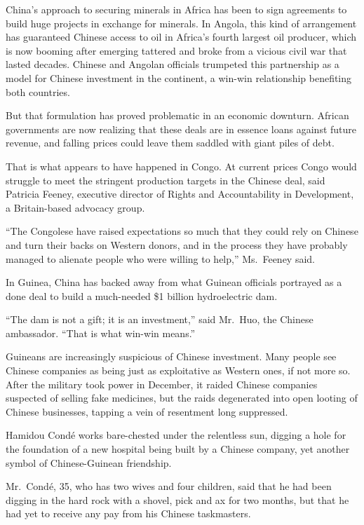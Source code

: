 \documentclass[12pt,a4paper,onecolumn]{article}
\begin{document}
\begin{CJK*}{GBK}{song}
China's approach to securing minerals in Africa has been to sign agreements to build huge projects
in exchange for minerals. In Angola, this kind of arrangement has guaranteed Chinese access to oil
in Africa's fourth largest oil producer, which is now booming after emerging tattered and broke from
a vicious civil war that lasted decades. Chinese and Angolan officials trumpeted this partnership as
a model for Chinese investment in the continent, a win-win relationship benefiting both countries.

But that formulation has proved problematic in an economic downturn. African governments are now
realizing that these deals are in essence loans against future revenue, and falling prices could
leave them saddled with giant piles of debt.

That is what appears to have happened in Congo. At current prices Congo would struggle to meet the
stringent production targets in the Chinese deal, said Patricia Feeney, executive director of Rights
and Accountability in Development, a Britain-based advocacy group.

``The Congolese have raised expectations so much that they could rely on Chinese and turn their
backs on Western donors, and in the process they have probably managed to alienate people who were
willing to help,'' Ms.~Feeney said.

In Guinea, China has backed away from what Guinean officials portrayed as a done deal to build a
much-needed \$1 billion hydroelectric dam.

``The dam is not a gift; it is an investment,'' said Mr.~Huo, the Chinese ambassador. ``That is what
win-win means.''

Guineans are increasingly suspicious of Chinese investment. Many people see Chinese companies as
being just as exploitative as Western ones, if not more so. After the military took power in
December, it raided Chinese companies suspected of selling fake medicines, but the raids degenerated
into open looting of Chinese businesses, tapping a vein of resentment long suppressed.

Hamidou Cond\'e works bare-chested under the relentless sun, digging a hole for the foundation of a
new hospital being built by a Chinese company, yet another symbol of Chinese-Guinean friendship.

Mr.~Cond\'e, 35, who has two wives and four children, said that he had been digging in the hard rock
with a shovel, pick and ax for two months, but that he had yet to receive any pay from his Chinese
taskmasters.


\end{CJK*}
\end{document}
